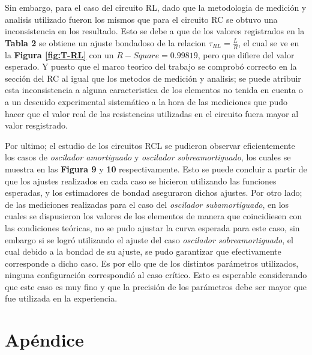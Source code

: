 \documentclass[11pt,a4paper]{article}
\begin{document}
Sin embargo, para el caso del circuito RL, dado que la metodologia de medición y analisis utilizado fueron los mismos que para el circuito RC se obtuvo una inconsistencia en los resultado. Esto se debe a que de los valores registrados en la \textbf{Tabla 2} se obtiene un ajuste bondadoso de la relacion $\tau_{RL} = \frac{L}{R}$, el cual se ve en la \textbf{Figura \ref{fig:T-RL}} con un $R-Square = 0.99819$, pero que difiere del valor esperado. Y puesto que el marco teorico del trabajo se comprobó correcto en la sección del RC al igual que los metodos de medición y analisis; se puede atribuir esta inconsistencia a alguna caracteristica de los elementos no tenida en cuenta o a un descuido experimental sistemático a la hora de las mediciones que pudo hacer que el valor real de las resistencias utilizadas en el circuito fuera mayor al valor resgistrado. 

Por ultimo; el estudio de los circuitos RCL se pudieron observar eficientemente los casos de \textit{oscilador amortiguado} y \textit{oscilador sobreamortiguado}, los cuales se muestra en las \textbf{Figura 9} y \textbf{10} respectivamente. Esto se puede concluir a partir de que los ajustes realizados en cada caso se hicieron utilizando las funciones esperadas, y los estimadores de bondad aseguraron dichos ajustes. Por otro lado; de las mediciones realizadas para el caso del \textit{oscilador subamortiguado}, en los cuales se dispusieron los valores de los elementos de manera que coincidiesen con las condiciones teóricas, no se pudo ajustar la curva esperada para este caso, sin embargo si se logró utilizando el ajuste del caso \textit{oscilador sobreamortiguado}, el cual debido a la bondad de su ajuste, se pudo garantizar que efectivamente corresponde a dicho caso. Es por ello que de los distintos parámetros utilizados, ninguna configuración correspondió al caso crítico. Esto es esperable considerando que este caso es muy fino y que la precisión de los parámetros debe ser mayor que fue utilizada en la experiencia.



\section{Apéndice}
\label{sec:apendice}
\end{document}

